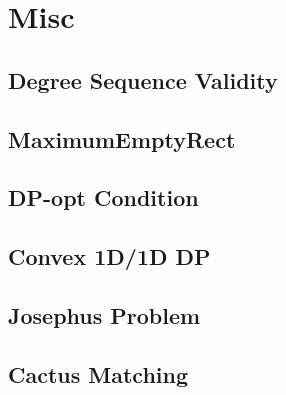 \documentclass[a4paper,10pt,twocolumn,oneside]{article}
\begin{document}
\section{Misc}
\subsection{Degree Sequence Validity}

\subsection{MaximumEmptyRect}

\subsection{DP-opt Condition}

\subsection{Convex 1D/1D DP}

\subsection{Josephus Problem}

\subsection{Cactus Matching}

\end{document}

